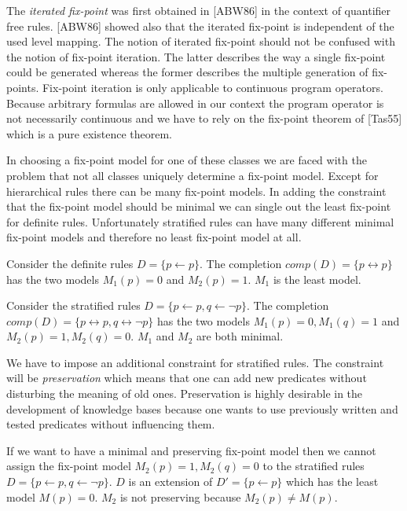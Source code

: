 The {\em iterated fix-point} was first obtained in [ABW86] in the context of quantifier free
rules. [ABW86] showed also that the iterated fix-point is independent of the used level mapping.
The notion of iterated fix-point should not be confused with the notion of fix-point iteration. 
The latter describes the way a single fix-point could be generated whereas the former describes 
the multiple generation of fix-points. Fix-point iteration is only applicable to continuous 
program operators. Because arbitrary formulas are allowed in our context the program operator 
is not necessarily continuous and we have to rely on the fix-point theorem of [Tas55] 
which is a pure existence theorem.

In choosing a fix-point model for one of these classes we are faced with the problem that not 
all classes uniquely determine a fix-point model. Except for hierarchical rules there can be many 
fix-point models. In adding the constraint that the fix-point model should be minimal we can
single out the least fix-point for definite rules. Unfortunately stratified rules can have
many different minimal fix-point models and therefore no least fix-point model at all.

\begin{Bsp} Consider the definite rules $D = \{ p \leftarrow p \}$. The completion $comp(D) =
\{ p \leftrightarrow p \}$ has the two models $M_1(p)=0$ and $M_2(p)=1$. $M_1$ is the
least model.
\end{Bsp}

\begin{Bsp} Consider the stratified rules $D = \{ p \leftarrow p, q \leftarrow \neg p \}$. The
completion $comp(D) = \{ p \leftrightarrow p, q \leftrightarrow \neg p \}$ has the two models
$M_1(p)=0, M_1(q)=1$ and $M_2(p)=1, M_2(q)=0$. $M_1$ and $M_2$ are both minimal.
\end{Bsp}

We have to impose an additional constraint for stratified rules. The constraint will be 
{\em preservation} which means that one can add new predicates without disturbing the meaning 
of old ones. Preservation is highly desirable in the development of knowledge bases because
one wants to use previously written and tested predicates without influencing them.

\begin{Bsp} If we want to have a minimal and preserving fix-point model then we cannot assign
the fix-point model $M_2(p)=1, M_2(q)=0$ to the stratified rules $D=\{ p \leftarrow p, q 
\leftarrow \neg p \}$. $D$ is an extension of $D'=\{p \leftarrow p\}$ which has the least 
model $M(p)=0$. $M_2$ is not preserving because $M_2(p)\not=M(p)$.
\end{Bsp}

